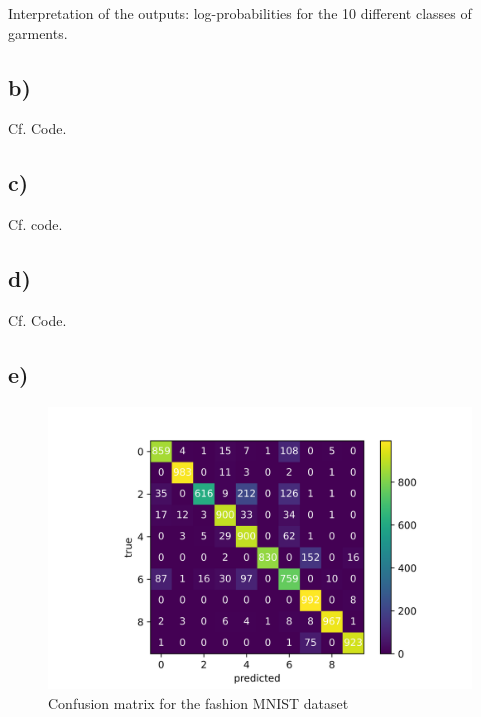 \documentclass[11pt]{article}
\begin{document}
Interpretation of the outputs: log-probabilities for the 10 different classes of garments.

\subsection{b)}\label{subsec:cnn-b}
Cf. Code.

\subsection{c)}\label{subsec:cnn-c}
Cf. code.
\subsection{d)}\label{subsec:cnn-d}
Cf. Code.
\subsection{e)}\label{subsec:cnn-e}

\begin{figure}[hbt]
  	\center
  	\includegraphics[width=\columnwidth]{assets/conf_mat}
  	\caption{Confusion matrix for the fashion MNIST dataset}
  	\label{fig:f-mnist-conf-mat}
\end{figure}
\end{document}
